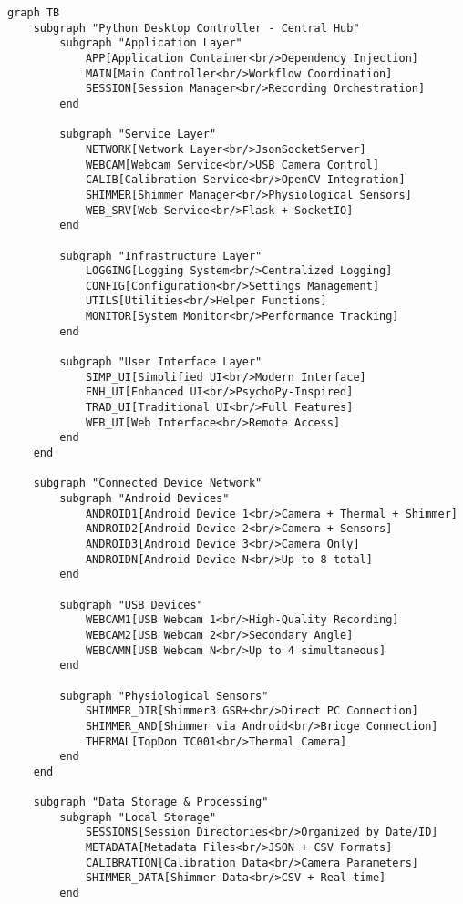 \documentclass[12pt,a4paper]{article}
\begin{document}
\begin{verbatim}
graph TB
    subgraph "Python Desktop Controller - Central Hub"
        subgraph "Application Layer"
            APP[Application Container<br/>Dependency Injection]
            MAIN[Main Controller<br/>Workflow Coordination]
            SESSION[Session Manager<br/>Recording Orchestration]
        end
        
        subgraph "Service Layer"
            NETWORK[Network Layer<br/>JsonSocketServer]
            WEBCAM[Webcam Service<br/>USB Camera Control]
            CALIB[Calibration Service<br/>OpenCV Integration]
            SHIMMER[Shimmer Manager<br/>Physiological Sensors]
            WEB_SRV[Web Service<br/>Flask + SocketIO]
        end
        
        subgraph "Infrastructure Layer"
            LOGGING[Logging System<br/>Centralized Logging]
            CONFIG[Configuration<br/>Settings Management]
            UTILS[Utilities<br/>Helper Functions]
            MONITOR[System Monitor<br/>Performance Tracking]
        end
        
        subgraph "User Interface Layer"
            SIMP_UI[Simplified UI<br/>Modern Interface]
            ENH_UI[Enhanced UI<br/>PsychoPy-Inspired]
            TRAD_UI[Traditional UI<br/>Full Features]
            WEB_UI[Web Interface<br/>Remote Access]
        end
    end
    
    subgraph "Connected Device Network"
        subgraph "Android Devices"
            ANDROID1[Android Device 1<br/>Camera + Thermal + Shimmer]
            ANDROID2[Android Device 2<br/>Camera + Sensors]
            ANDROID3[Android Device 3<br/>Camera Only]
            ANDROIDN[Android Device N<br/>Up to 8 total]
        end
        
        subgraph "USB Devices"
            WEBCAM1[USB Webcam 1<br/>High-Quality Recording]
            WEBCAM2[USB Webcam 2<br/>Secondary Angle]
            WEBCAMN[USB Webcam N<br/>Up to 4 simultaneous]
        end
        
        subgraph "Physiological Sensors"
            SHIMMER_DIR[Shimmer3 GSR+<br/>Direct PC Connection]
            SHIMMER_AND[Shimmer via Android<br/>Bridge Connection]
            THERMAL[TopDon TC001<br/>Thermal Camera]
        end
    end
    
    subgraph "Data Storage & Processing"
        subgraph "Local Storage"
            SESSIONS[Session Directories<br/>Organized by Date/ID]
            METADATA[Metadata Files<br/>JSON + CSV Formats]
            CALIBRATION[Calibration Data<br/>Camera Parameters]
            SHIMMER_DATA[Shimmer Data<br/>CSV + Real-time]
        end
        

\end{verbatim}
\end{document}
